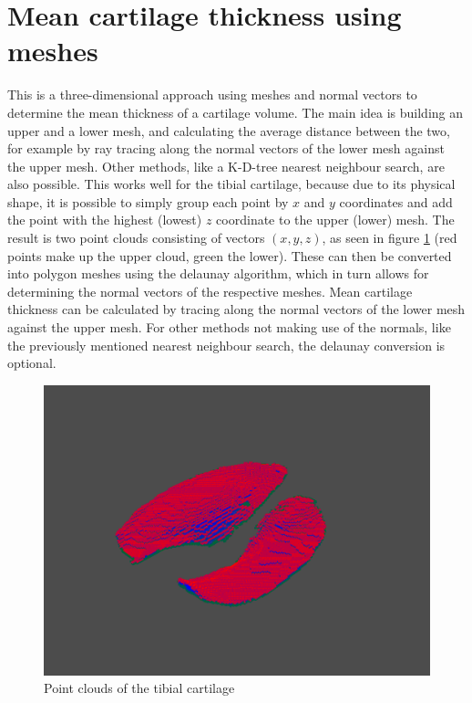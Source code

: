\section{Mean cartilage thickness using meshes}
This is a three-dimensional approach using meshes and normal vectors to determine the mean thickness of a cartilage volume. The main idea is building an upper and a lower mesh, and calculating the average distance between the two, for example by ray tracing along the normal vectors of the lower mesh against the upper mesh. Other methods, like a K-D-tree nearest neighbour search, are also possible. This works well for the tibial cartilage, because due to its physical shape, it is possible to simply group each point by $x$ and $y$ coordinates and add the point with the highest (lowest) $z$ coordinate to the upper (lower) mesh. The result is two point clouds consisting of vectors $(x, y, z)$, as seen in figure \ref{fig:tibial_point_cloud} (red points make up the upper cloud, green the lower). These can then be converted into polygon meshes using the delaunay algorithm, which in turn allows for determining the normal vectors of the respective meshes. Mean cartilage thickness can be calculated by tracing along the normal vectors of the lower mesh against the upper mesh. For other methods not making use of the normals, like the previously mentioned nearest neighbour search, the delaunay conversion is optional. 
\begin{figure}[htb!]
	\centering
	\includegraphics[width=\linewidth]{./figures/s2}
	\caption{Point clouds of the tibial cartilage}
	\label{fig:tibial_point_cloud}
\end{figure}
